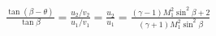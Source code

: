 \documentclass[10pt]{article}
\begin{document}
\begin{align*}\frac{\tan \left( \beta - \theta \right)}{\tan \beta}
= \frac{u_{2}/v_{2}}{u_{1}/v_{1}}
= \frac{u_{2}}{u_{1}}
= \frac{
\left(\gamma - 1 \right) M_{1}^{2} \sin^2 \beta +2
}
{
\left(\gamma+1\right) M_{1}^{2} \sin^2 \beta
}\end{align*}
\end{document}
